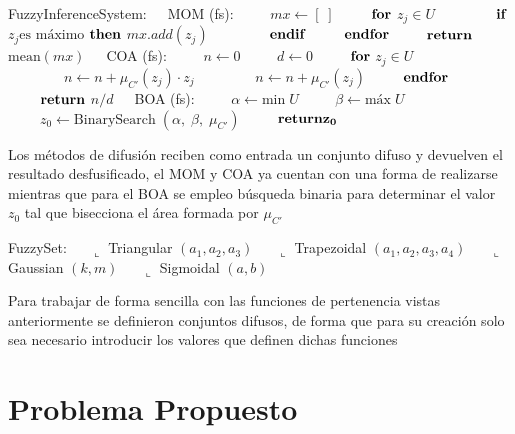 \documentclass[a4paper,10pt,twocolumn]{article}
\begin{document}
\begin{algorithm}
	\begin{algorithmic}
		\STATE FuzzyInferenceSystem:
		\STATE $ \;\;\;$ MOM (fs):
		\STATE $ \qquad\; mx \leftarrow [\;]$ 
		\STATE $ \qquad\; \bf{for}$ $z_j \in U $
		\STATE $ \qquad\qquad \bf{if}$ $z_j \text{es m\'aximo}$ $\bf{then}$ $ mx.add(z_j)$
		\STATE $ \qquad\qquad \bf{endif}$
		\STATE $ \qquad\; \bf{endfor}$ 
		\STATE $ \qquad\; \bf{return}$ $\text{mean} (mx)$
		\STATE
		\STATE $ \;\;\;$ COA (fs):
		\STATE $ \qquad\; n \leftarrow 0$ 
		\STATE $ \qquad\; d \leftarrow 0$
		\STATE $ \qquad\; \bf{for}$ $z_j \in U $
		\STATE $ \qquad\qquad n \leftarrow n + \mu_{C'} (z_j) \cdot z_j$
		\STATE $ \qquad\qquad n \leftarrow n + \mu_{C'} (z_j)$
		\STATE $ \qquad\; \bf{endfor}$ 
		\STATE $ \qquad\; \bf{return}$ $ n / d$
		\STATE
		\STATE $ \;\;\;$ BOA (fs):
		\STATE $ \qquad\; \alpha \leftarrow \text{min} \;U$ 
		\STATE $ \qquad\; \beta \leftarrow \text{m\'ax} \;U$
		\STATE $ \qquad\; z_0 \leftarrow \text{BinarySearch} \;(\alpha,\; \beta,\; \mu_{C'})$
		\STATE $ \qquad\; \bf{return} z_0$
	\end{algorithmic}
\end{algorithm}

Los m\'etodos de difusi\'on reciben como entrada un conjunto difuso y devuelven el resultado desfusificado, el MOM y COA ya cuentan con una forma de realizarse mientras que para el BOA se empleo b\'usqueda binaria para determinar el valor $z_0$ tal que bisecciona el \'area formada por $\mu_{C'}$

\begin{algorithm}
	\begin{algorithmic}
		\STATE FuzzySet:
		\STATE $\quad$ $\llcorner$ Triangular $(a_1, a_2, a_3)$
		\STATE $\quad$ $\llcorner$ Trapezoidal $(a_1, a_2, a_3, a_4)$
		\STATE $\quad$ $\llcorner$ Gaussian $(k, m)$
		\STATE $\quad$ $\llcorner$ Sigmoidal $(a, b)$
	\end{algorithmic}
\end{algorithm}

Para trabajar de forma sencilla con las funciones de pertenencia vistas anteriormente se definieron conjuntos difusos, de forma que para su creaci\'on solo sea necesario introducir los valores que definen dichas funciones 

\section*{Problema Propuesto}\label{sec:dev}
 
\end{document}
